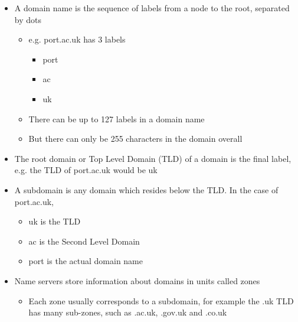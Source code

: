 \begin{itemize}
  \item A domain name is the sequence of labels from a node to the root, separated by dots
  \begin{itemize}
    \item e.g. port.ac.uk has 3 labels
    \begin{itemize}
      \item port
      \item ac
      \item uk
    \end{itemize}
    \item There can be up to 127 labels in a domain name
    \item But there can only be 255 characters in the domain overall
  \end{itemize}
  \item The root domain or Top Level Domain (TLD) of a domain is the final label, e.g. the TLD of port.ac.uk would be uk
  \item A subdomain is any domain which resides below the TLD. In the case of port.ac.uk,
  \begin{itemize}
    \item uk is the TLD
    \item ac is the Second Level Domain
    \item port is the actual domain name
  \end{itemize}
  \item Name servers store information about domains in units called zones
  \begin{itemize}
    \item Each zone usually corresponds to a subdomain, for example the .uk TLD has many sub-zones, such as .ac.uk, .gov.uk and .co.uk
  \end{itemize}
\end{itemize}